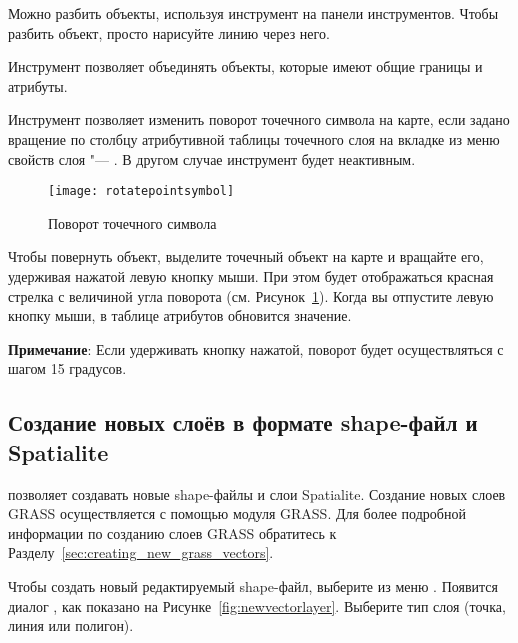 Можно разбить объекты, используя инструмент
 на панели
инструментов. Чтобы разбить объект, просто нарисуйте линию через него.


Инструмент 
позволяет объединять объекты, которые имеют общие границы и атрибуты.


Инструмент  позволяет
изменить поворот точечного символа на карте, если задано вращение по столбцу
атрибутивной таблицы точечного слоя на вкладке  из меню
свойств слоя "--- . В другом случае инструмент будет
неактивным.

\begin{figure}[ht]
   \centering
   \texttt{[image: rotatepointsymbol]}
   \caption{Поворот точечного символа \wincaption}\label{fig:rotatepoint}
\end{figure}

Чтобы повернуть объект, выделите точечный объект на карте и вращайте его,
удерживая нажатой левую кнопку мыши. При этом будет отображаться красная
стрелка с величиной угла поворота (см. Рисунок~\ref{fig:rotatepoint}).
Когда вы отпустите левую кнопку мыши, в таблице атрибутов обновится значение.

\textbf{Примечание}: Если удерживать кнопку  нажатой, поворот
будет осуществляться с шагом 15 градусов.

\subsection{Создание новых слоёв в формате shape-файл и Spatialite}\label{sec:create shape}

\qg позволяет создавать новые shape-файлы и слои Spatialite. Создание новых
слоев GRASS осуществляется с помощью модуля GRASS. Для более подробной
информации по созданию слоев GRASS обратитесь к Разделу~\ref{sec:creating_new_grass_vectors}.

\label{sec:create shape}

Чтобы создать новый редактируемый shape-файл, выберите  \arrow
{} из меню
. Появится диалог , как показано
на Рисунке~\ref{fig:newvectorlayer}. Выберите тип слоя (точка, линия или полигон).


